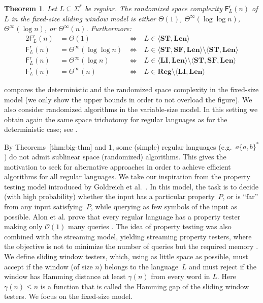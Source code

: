\documentclass{article}\usepackage[a4paper,margin=20mm]{geometry}
\newtheorem{theorem}{Theorem}\newtheorem{lemma}[theorem]{Lemma}\newtheorem{proposition}[theorem]{Proposition}\newtheorem{corollary}[theorem]{Corollary}\newtheorem{definition}[theorem]{Definition}\newtheorem{claim}[theorem]{Claim}\newtheorem{remark}[theorem]{Remark}\newtheorem{observation}[theorem]{Observation}\newtheorem{conjecture}[theorem]{Conjecture}\newtheorem{example}[theorem]{Example}
\renewcommand{\O}{\mathcal{O}}
\newcommand{\F}{\mathsf{F}}
\renewcommand{\r}{\mathsf{r}}
\newcommand{\Reg}{\mathbf{Reg}}
\newcommand{\Len}{\mathbf{Len}}
\newcommand{\LI}{\mathbf{LI}}
\newcommand{\ST}{\mathbf{ST}}
\newcommand{\SF}{\mathbf{SF}}
\renewcommand{\leq}{\leqslant}
\newcommand{\Thetainf}{\Theta^{\scriptscriptstyle{\infty}}}
\begin{document}
\begin{theorem} \label{thm:r-char}
	Let $L \subseteq \Sigma^*$ be regular.
	The randomized space complexity $\F^\r_L(n)$ of $L$
	in the fixed-size sliding window model is either
	$\Theta(1)$, $\Thetainf(\log \log n)$, $\Thetainf(\log n)$, or $\Thetainf(n)$.
	Furthermore:
	\begin{alignat*}{2}
        \F^\r_L(n)  &= \Theta(1) & \ \iff \ & L \in \langle \ST, \Len \rangle \\
        \F^\r_L(n) &= \Thetainf(\log \log n) & \ \iff \ & L \in \langle \ST, \SF, \Len \rangle \setminus \langle \ST, \Len \rangle \\
        \F^\r_L(n) &= \Thetainf(\log n) & \ \iff \ & L \in \langle \LI, \Len \rangle \setminus \langle \ST, \SF, \Len \rangle \\
        \F^\r_L(n) &= \Thetainf(n) & \ \iff \ & L \in \Reg \setminus  \langle \LI, \Len \rangle
         \end{alignat*}
\end{theorem}
 compares the deterministic and the randomized space complexity in the fixed-size model (we only show the upper bounds in order
to not overload the figure).
We also consider randomized algorithms in the variable-size model.
In this setting we obtain again the same space trichotomy for regular languages 
as for the deterministic case; see .


By Theorems~\ref{thm:big-thm} and \ref{thm:r-char}, some (simple) regular languages
(e.g.~$a \{a,b\}^*$) do not admit sublinear space (randomized) algorithms.
This gives the motivation to seek for alternative approaches in order to
achieve efficient algorithms for all regular languages.
We take our inspiration from the property testing model introduced by Goldreich et al.~\cite{GoldreichGR98}.
In this model, the task is to decide (with high probability)
whether the input has a particular property~$P$,
or is ``far'' from any input satisfying~$P$, while querying as few symbols of the input as possible.
Alon et al. prove that every regular language has a property tester
making only $\O(1)$ many queries \cite{AlonKNS00}.
The idea of property testing was also combined with the streaming model,
yielding streaming property testers,
where the objective is not to minimize the number of queries but the required memory
\cite{FeigenbaumKSV02,FrancoisMRS16}.
We define sliding window testers,
which, using as little space as possible,
must accept if the window (of size $n$) belongs to the language~$L$
and must reject if the window has Hamming distance at least $\gamma(n)$ from every
word in $L$. Here $\gamma(n) \leq n$ is a function that is called the Hamming gap of
the sliding window testers. We focus on the fixed-size model.
\end{document}

